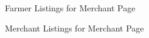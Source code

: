 \documentclass{article}
\begin{document}
\begin{figure}[htbp]
  \centering
  \caption{Farmer Listings for Merchant Page}
\end{figure}

\begin{figure}[htbp]
  \centering
  \caption{Merchant Listings for Merchant Page}
\end{figure}
\end{document}
